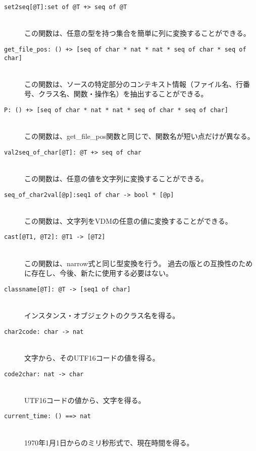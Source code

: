 \documentclass[\pformat,12pt]{jarticle}
\begin{document}
\begin{description}
\item[\texttt{set2seq[@T]:set of @T +> seq of @T}] \mbox{}\\
この関数は、任意の型を持つ集合を簡単に列に変換することができる。

\item[\texttt{get\_file\_pos: () +> [seq of char * nat
* nat * seq of char * seq of char]}] \mbox{}\\
この関数は、ソースの特定部分のコンテキスト情報（ファイル名、行番号、クラス名、関数・操作名）を抽出することができる。

\item[\texttt{P: () +> [seq of char * nat
* nat * seq of char * seq of char]}] \mbox{}\\
この関数は、get\_file\_pos関数と同じで、関数名が短い点だけが異なる。

\item[\texttt{val2seq\_of\_char[@T]: @T +> seq of char}] \mbox{}\\
この関数は、任意の値を文字列に変換することができる。

\item[\texttt{seq\_of\_char2val[@p]:seq1 of char -> bool * [@p]}] \mbox{}\\
この関数は、文字列をVDMの任意の値に変換することができる。

\item[\texttt{cast[@T1, @T2]: @T1 -> [@T2]}] \mbox{}\\
この関数は、narrow式と同じ型変換を行う。
過去の版との互換性のために存在し、今後、新たに使用する必要はない。


\item[\texttt{classname[@T]: @T -> [seq1 of char]}] \mbox{}\\
インスタンス・オブジェクトのクラス名を得る。

\item[\texttt{char2code: char -> nat}] \mbox{}\\
文字から、そのUTF16コードの値を得る。

\item[\texttt{code2char: nat -> char}] \mbox{}\\
UTF16コードの値から、文字を得る。

\item[\texttt{current\_time: () ==> nat}] \mbox{}\\
1970年1月1日からのミリ秒形式で、現在時間を得る。

\end{description}
\end{document}
